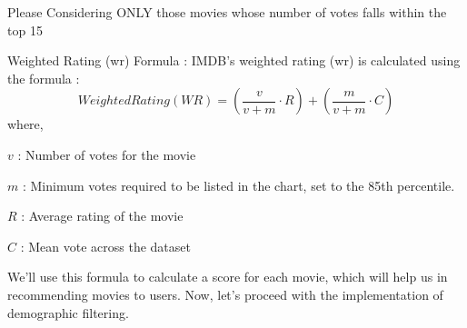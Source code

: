 

Please Considering ONLY those movies whose number of votes falls within the top 15%

Weighted Rating (wr) Formula : IMDB's weighted rating (wr) is calculated using the formula :
\begin{equation}
Weighted Rating(WR) = \left(\frac{v}{v+m}\cdot R \right) + \left(\frac{m}{v+m} \cdot C \right)
\end{equation}
where,
\begin{enumrate}
\item $v$ : Number of votes for the movie
\item $m$ : Minimum votes required to be listed in the chart, set to the 85th percentile.
\item $R$ : Average rating of the movie
\item $C$ : Mean vote across the dataset
\end{enumrate}
We'll use this formula to calculate a score for each movie, which will help us in recommending movies to users.
Now, let's proceed with the implementation of demographic filtering.
